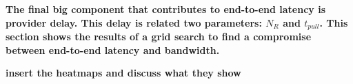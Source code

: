 \documentclass[a4paper,11pt,oneside]{report}
\begin{document}
\textbf{The final big component that contributes to end-to-end latency is provider delay. This delay is related two parameters: \(N_R\) and \(t_{pull}\). This section shows the results of a grid search to find a compromise between end-to-end latency and bandwidth.}

\textbf{insert the heatmaps and discuss what they show}





\end{document}
